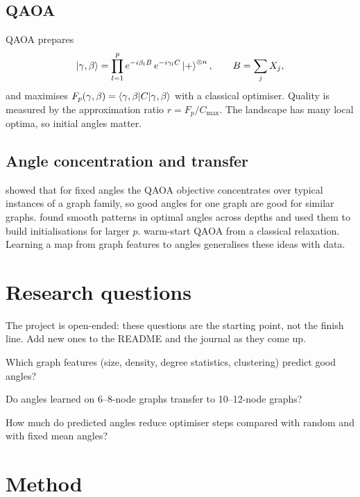 \documentclass[11pt,a4paper]{article}
\begin{document}
\subsection{QAOA}
QAOA \citep{farhi2014} prepares
\begin{equation}
  \ket{\gamma,\beta}=\prod_{l=1}^{p}e^{-i\beta_lB}\,e^{-i\gamma_lC}\ket{+}^{\otimes n},
  \qquad B=\sum_jX_j,
\end{equation}
and maximises $F_p(\gamma,\beta)=\braket{\gamma,\beta|C|\gamma,\beta}$ with a classical optimiser. Quality
is measured by the approximation ratio $r=F_p/C_{\max}$. The landscape has many local optima, so
initial angles matter.

\subsection{Angle concentration and transfer}
\citet{brandao2018} showed that for fixed angles the QAOA objective concentrates over typical
instances of a graph family, so good angles for one graph are good for similar graphs.
\citet{zhou2020} found smooth patterns in optimal angles across depths and used them to build
initialisations for larger $p$. \citet{egger2021} warm-start QAOA from a classical relaxation. Learning
a map from graph features to angles generalises these ideas with data.

\section{Research questions}
The project is open-ended: these questions are the starting point, not the finish line. Add new
ones to the README and the journal as they come up.

\begin{rqlist}
  \item Which graph features (size, density, degree statistics, clustering) predict good angles?
  \item Do angles learned on 6--8-node graphs transfer to 10--12-node graphs?
  \item How much do predicted angles reduce optimiser steps compared with random and with fixed mean angles?
\end{rqlist}

\section{Method}
\end{document}
